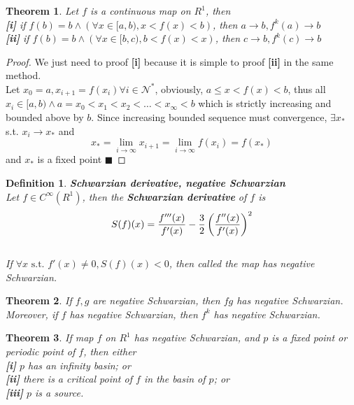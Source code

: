 \documentclass[12pt]{article}
\theoremstyle{plain}
\newtheorem{theorem}{\textbf{Theorem}}[section]
\newtheorem{definition}{{\color{red}\textbf{Definition}}}[section]
\newtheorem{proof}{\textit{PROOF}}[section]
\begin{document}
\begin{theorem}\label{basin-theo}Let $f$ is a continuous map on $R^1$, then 
\\\noindent \textbf{[i]} if $f(b) = b \land \left(\forall x \in [a, b), x < f(x) < b\right)$, then $a\rightarrow b, f^k(a) \rightarrow  b$
\\\noindent \textbf{[ii]} if $f(b) = b \land \left(\forall x \in [b, c), b < f(x) < x\right)$, then $c\rightarrow b, f^k(c) \rightarrow  b$
\end{theorem}

{\color{blue}
\begin{proof} We just need to proof \textbf{[i]} because it is simple to proof \textbf{[ii]} in the same method.
\\\noindent Let $x_0 = a, x_{i+1} = f(x_{i}) \forall i \in \mathcal N^*$, obviously, $a \leq x < f(x) < b$, thus all $x_i \in [a, b) \land a = x_0 < x_1 < x_2 < \ldots < x_\infty < b$ which is strictly increasing and bounded above by $b$. Since increasing bounded sequence must convergence, $\exists x_*$ s.t. $x_i \rightarrow x_*$ and 
$$
x_* = \lim_{i \rightarrow \infty}x_{i+1} = \lim_{i \rightarrow \infty}f(x_i) = f(x_*) 
$$
and $x_*$ is a fixed point $\blacksquare$
\end{proof}
}





\begin{definition}\label{Schwarzian-derivative}\textbf{Schwarzian derivative, negative Schwarzian}
\\\noindent Let $f \in C^\infty(R^1)$, then the \textbf{Schwarzian derivative} of $f$ is
$$
S(f)(x) = {f'''(x) \over f'(x)} - {3\over 2}\left({f''(x) \over f'(x)}\right)^2
$$
\\\noindent If $\forall x \text{ s.t. } f'(x) \neq 0, S(f)(x) < 0$, then called the map has negative Schwarzian.
\end{definition}

\begin{theorem}\label{periodic-schwarzian} If $f, g$ are negative Schwarzian, then $fg$ has negative Schwarzian. Moreover, if $f$ has negative Schwarzian, then $f^k$ has negative Schwarzian. 
\end{theorem}

\begin{theorem}\label{schwarzian-theo} If map $f$ on $R^1$ has negative Schwarzian, and $p$ is a fixed point or periodic point of $f$, then either
\\\noindent \textbf{[i]} $p$ has an infinity basin; or
\\\noindent \textbf{[ii]} there is a critical point of $f$ in the basin of $p$; or
\\\noindent \textbf{[iii]} $p$ is a source.
\end{theorem}
\end{document}

